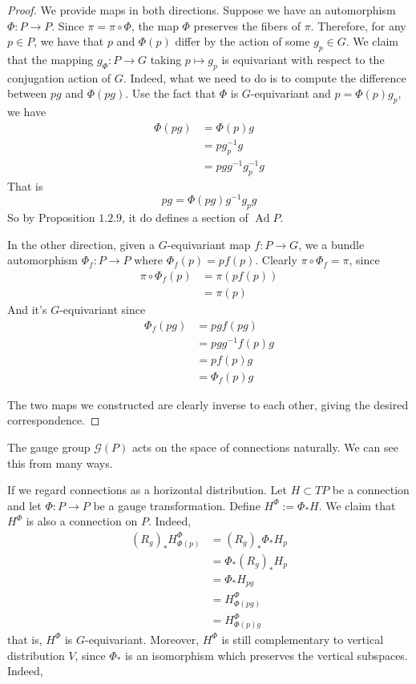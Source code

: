 \documentclass[11pt]{amsart}
\numberwithin{equation}{section}
\theoremstyle{plain}
\theoremstyle{plain}
\numberwithin{equation}{section}
\begin{document}
\begin{proof}
We provide maps in both directions. Suppose we have an automorphism $\Phi:P\to P$. Since $\pi=\pi\circ\Phi$, the map $\Phi$ preserves the fibers of $\pi$. Therefore, for any $p\in P$, we have that $p$ and $\Phi(p)$ differ by the action of some $g_p\in G$. We claim that the mapping $g_{\Phi}:P\to G$ taking $p\mapsto g_p$ is equivariant with respect to the conjugation action of $G$. Indeed, what we need to do is to compute the difference between $pg$ and $\Phi(pg)$. Use the fact that $\Phi$ is $G$-equivariant and $p=\Phi(p)g_p$, we have
$$
\begin{aligned}
\Phi(pg)&=\Phi(p)g\\
&=pg_p^{-1}g\\
&=pgg^{-1}g_p^{-1}g
\end{aligned}
$$
That is
$$
pg=\Phi(pg)g^{-1}g_pg
$$
So by Proposition $1.2.9$, it do defines a section of $\operatorname{Ad}P$.

In the other direction, given a $G$-equivariant map $f:P\to G$, we a bundle automorphism $\Phi_f:P\to P$ where $\Phi_f(p)=pf(p)$. Clearly $\pi\circ\Phi_f=\pi$, since 
$$
\begin{aligned}
\pi\circ\Phi_f(p)&=\pi(pf(p))\\
&=\pi(p)
\end{aligned}
$$
And it's $G$-equivariant since
$$
\begin{aligned}
\Phi_f(pg)&=pgf(pg)\\
&=pgg^{-1}f(p)g\\
&=pf(p)g\\
&=\Phi_f(p)g
\end{aligned}
$$

The two maps we constructed are clearly inverse to each other, giving the desired correspondence.
\end{proof}

The gauge group $\mathscr{G}(P)$ acts on the space of connections naturally. We can see this from many ways.

If we regard connections as a horizontal distribution. Let $H\subset TP$ be a connection and let $\Phi:P\to P$ be a gauge transformation. Define $H^{\Phi}:=\Phi_*H$. We claim that $H^{\Phi}$ is also a connection on $P$. Indeed,
$$
\begin{aligned}
\left(R_{g}\right)_{*} H_{\Phi(p)}^{\Phi} &=\left(R_g\right)_{*} \Phi_{*} H_p \\
&=\Phi_{*}\left(R_g\right)_{*} H_p \\
&=\Phi_{*} H_{p g} \\
&=H_{\Phi(p g)}^{\Phi} \\
&=H_{\Phi(p) g}^{\Phi}
\end{aligned}
$$
that is, $H^{\Phi}$ is $G$-equivariant. Moreover, $H^{\Phi}$ is still complementary to vertical distribution $V$, since $\Phi_*$ is an isomorphism which preserves the vertical subspaces. Indeed,
\end{document}
